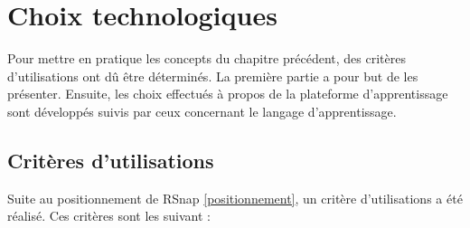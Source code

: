 \section{Choix technologiques}
\label{techno}
Pour mettre en pratique les concepts du chapitre précédent, des critères d'utilisations ont dû être déterminés. La première partie a pour but de les présenter. Ensuite, les choix effectués à propos de la plateforme d'apprentissage sont développés suivis par ceux concernant le langage d'apprentissage.




\subsection{Critères d'utilisations}
Suite au positionnement de RSnap \ref{positionnement}, un critère d'utilisations a été réalisé. Ces critères sont les suivant :



